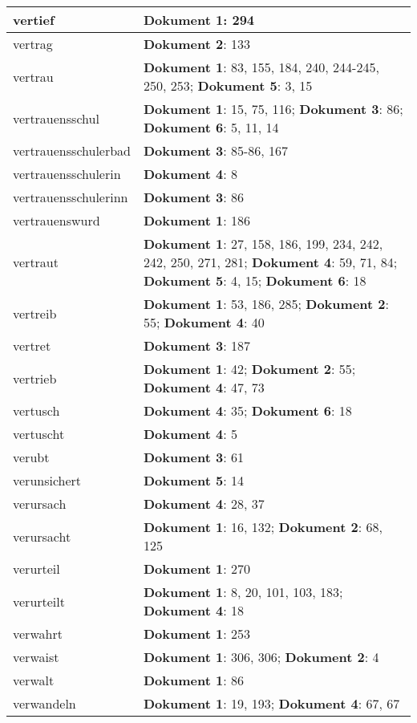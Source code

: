 \documentclass[a5paper]{article}
\begin{document}
\begin{longtable}[l]{|l|p{3in}|}
\hline
vertief & \textbf{Dokument 1}: 294 \\
\hline
vertrag & \textbf{Dokument 2}: 133 \\
\hline
vertrau & \textbf{Dokument 1}: 83, 155, 184, 240, 244-245, 250, 253; \textbf{Dokument 5}: 3, 15 \\
\hline
vertrauensschul & \textbf{Dokument 1}: 15, 75, 116; \textbf{Dokument 3}: 86; \textbf{Dokument 6}: 5, 11, 14 \\
\hline
vertrauensschulerbad & \textbf{Dokument 3}: 85-86, 167 \\
\hline
vertrauensschulerin & \textbf{Dokument 4}: 8 \\
\hline
vertrauensschulerinn & \textbf{Dokument 3}: 86 \\
\hline
vertrauenswurd & \textbf{Dokument 1}: 186 \\
\hline
vertraut & \textbf{Dokument 1}: 27, 158, 186, 199, 234, 242, 242, 250, 271, 281; \textbf{Dokument 4}: 59, 71, 84; \textbf{Dokument 5}: 4, 15; \textbf{Dokument 6}: 18 \\
\hline
vertreib & \textbf{Dokument 1}: 53, 186, 285; \textbf{Dokument 2}: 55; \textbf{Dokument 4}: 40 \\
\hline
vertret & \textbf{Dokument 3}: 187 \\
\hline
vertrieb & \textbf{Dokument 1}: 42; \textbf{Dokument 2}: 55; \textbf{Dokument 4}: 47, 73 \\
\hline
vertusch & \textbf{Dokument 4}: 35; \textbf{Dokument 6}: 18 \\
\hline
vertuscht & \textbf{Dokument 4}: 5 \\
\hline
verubt & \textbf{Dokument 3}: 61 \\
\hline
verunsichert & \textbf{Dokument 5}: 14 \\
\hline
verursach & \textbf{Dokument 4}: 28, 37 \\
\hline
verursacht & \textbf{Dokument 1}: 16, 132; \textbf{Dokument 2}: 68, 125 \\
\hline
verurteil & \textbf{Dokument 1}: 270 \\
\hline
verurteilt & \textbf{Dokument 1}: 8, 20, 101, 103, 183; \textbf{Dokument 4}: 18 \\
\hline
verwahrt & \textbf{Dokument 1}: 253 \\
\hline
verwaist & \textbf{Dokument 1}: 306, 306; \textbf{Dokument 2}: 4 \\
\hline
verwalt & \textbf{Dokument 1}: 86 \\
\hline
verwandeln & \textbf{Dokument 1}: 19, 193; \textbf{Dokument 4}: 67, 67 \\

\end{longtable}
\end{document}
